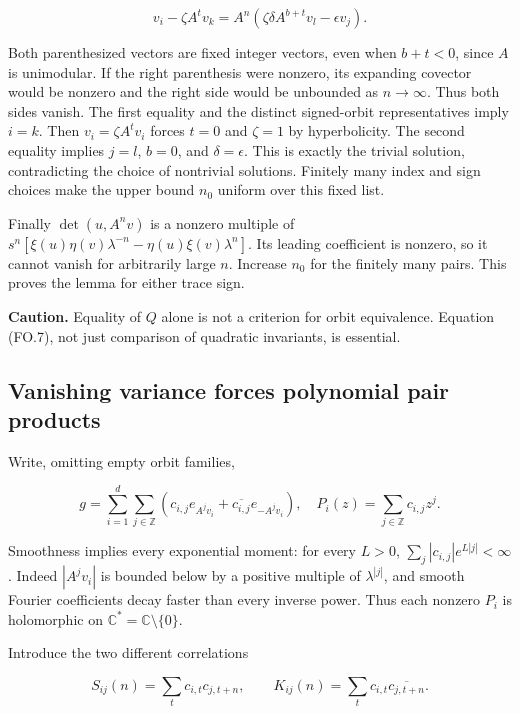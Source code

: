 \[
 v_i-\zeta A^t v_k
   =A^n(\zeta\delta A^{b+t}v_l-\epsilon v_j).
\tag{FO.7}
\]

Both parenthesized vectors are fixed integer vectors, even when \(b+t<0\), since \(A\) is unimodular. If the right parenthesis were nonzero, its expanding covector would be nonzero and the right side would be unbounded as \(n\to\infty\). Thus both sides vanish. The first equality and the distinct signed-orbit representatives imply \(i=k\). Then \(v_i=\zeta A^t v_i\) forces \(t=0\) and \(\zeta=1\) by hyperbolicity. The second equality implies \(j=l\), \(b=0\), and \(\delta=\epsilon\). This is exactly the trivial solution, contradicting the choice of nontrivial solutions. Finitely many index and sign choices make the upper bound \(n_0\) uniform over this fixed list.

Finally \(\det(u,A^n v)\) is a nonzero multiple of \(s^n[\xi(u)\eta(v)\lambda^{-n}-\eta(u)\xi(v)\lambda^n]\). Its leading coefficient is nonzero, so it cannot vanish for arbitrarily large \(n\). Increase \(n_0\) for the finitely many pairs. This proves the lemma for either trace sign.

\textbf{Caution.} Equality of \(Q\) alone is not a criterion for orbit equivalence. Equation (FO.7), not just comparison of quadratic invariants, is essential.

\hypertarget{vanishing-variance-forces-polynomial-pair-products}{%
\subsection{Vanishing variance forces polynomial pair products}\label{vanishing-variance-forces-polynomial-pair-products}}

Write, omitting empty orbit families,

\[
 g=\sum_{i=1}^d\sum_{j\in\mathbb Z}
   (c_{i,j}e_{A^jv_i}+\overline{c_{i,j}}e_{-A^jv_i}),
 \quad
 P_i(z)=\sum_{j\in\mathbb Z}c_{i,j}z^j.
\tag{FO.8}
\]

Smoothness implies every exponential moment: for every \(L>0\), \(\sum_j|c_{i,j}|e^{L|j|}<\infty\). Indeed \(|A^jv_i|\) is bounded below by a positive multiple of \(\lambda^{|j|}\), and smooth Fourier coefficients decay faster than every inverse power. Thus each nonzero \(P_i\) is holomorphic on \(\mathbb C^*=\mathbb C\setminus\{0\}\).

Introduce the two different correlations

\[
 S_{ij}(n)=\sum_t c_{i,t}c_{j,t+n},\qquad
 K_{ij}(n)=\sum_t c_{i,t}\overline{c_{j,t+n}}.
\tag{FO.9}
\]

